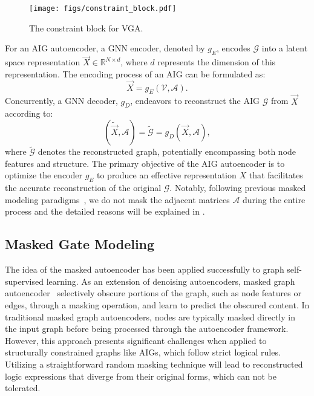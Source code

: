 \begin{wrapfigure}{r}{0.50\linewidth}
\centering
\vspace{-1.5em}
\texttt{[image: figs/constraint\_block.pdf]}
\caption{The constraint block for VGA.}
\label{fig:con_block}
\vspace{2.5em}
\end{wrapfigure}
For an AIG autoencoder, a GNN encoder, denoted by $g_E$, encodes $\mathcal{G}$ into a latent space representation $\Vec{X} \in \mathbb{R}^{N \times d}$, where $d$ represents the dimension of this representation. 
The encoding process of an AIG can be formulated as:
\begin{equation}
    \Vec{X} = g_{E}(\mathcal{V}, \mathcal{A}).
    \label{eq:encoder}
\end{equation}
Concurrently, a GNN decoder, $g_D$, endeavors to reconstruct the AIG $\mathcal{G}$ from $\Vec{X}$ according to:
\begin{equation}
    (\tilde{\Vec{X}}, \mathcal{A}) = \tilde{\mathcal{G}} = g_{D}(\Vec{X}, \mathcal{A}),
   	\label{eq:decoder}
\end{equation}
where $\tilde{\mathcal{G}}$ denotes the reconstructed graph, potentially encompassing both node features and structure.
The primary objective of the AIG autoencoder is to optimize the encoder $g_E$ to produce an effective representation $X$ that facilitates the accurate reconstruction of the original $\mathcal{G}$.
Notably, following previous masked modeling paradigms~\citep{hou2022graphmae, hou2023graphmae2}, we do not mask the adjacent matrices $\mathcal{A}$ during the entire process and the detailed reasons will be explained in .

\subsection{Masked Gate Modeling}
\label{sec:mgam}
The idea of the masked autoencoder has been applied successfully to graph self-supervised learning. 
As an extension of denoising autoencoders, masked graph autoencoder~\citep{hou2023graphmae2, li2023maskgae} selectively obscure portions of the graph, such as node features or edges, through a masking operation, and learn to predict the obscured content.
In traditional masked graph autoencoders, nodes are typically masked directly in the input graph before being processed through the autoencoder framework.
However, this approach presents significant challenges when applied to structurally constrained graphs like AIGs, which follow strict logical rules. 
Utilizing a straightforward random masking technique will lead to reconstructed logic expressions that diverge from their original forms, which can not be tolerated.

